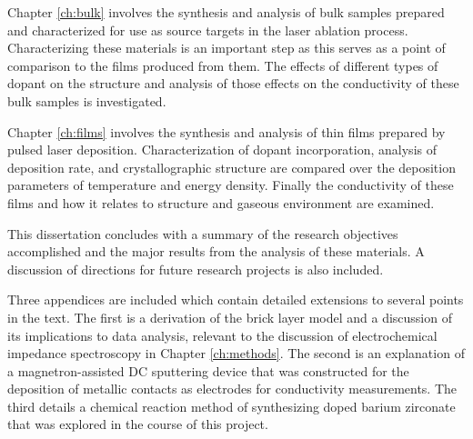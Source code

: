 Chapter \ref{ch:bulk} involves the synthesis and analysis of bulk samples prepared and characterized for use as source targets in the laser ablation process. Characterizing these materials is an important step as this serves as a point of comparison to the films produced from them. The effects of different types of dopant on the structure and analysis of those effects on the conductivity of these bulk samples is investigated.

Chapter \ref{ch:films} involves the synthesis and analysis of thin films prepared by pulsed laser deposition. Characterization of dopant incorporation, analysis of deposition rate, and crystallographic structure are compared over the deposition parameters of temperature and energy density. Finally the conductivity of these films and how it relates to structure and gaseous environment are examined.

This dissertation concludes with a summary of the research objectives accomplished and the major results from the analysis of these materials. A discussion of directions for future research projects is also included. 

Three appendices are included which contain detailed extensions to several points in the text. The first is a derivation of the brick layer model and a discussion of its implications to data analysis, relevant to the discussion of electrochemical impedance spectroscopy in Chapter \ref{ch:methods}. The second is an explanation of a magnetron-assisted DC sputtering device that was constructed for the deposition of metallic contacts as electrodes for conductivity measurements. The third details a chemical reaction method of synthesizing doped barium zirconate that was explored in the course of this project.